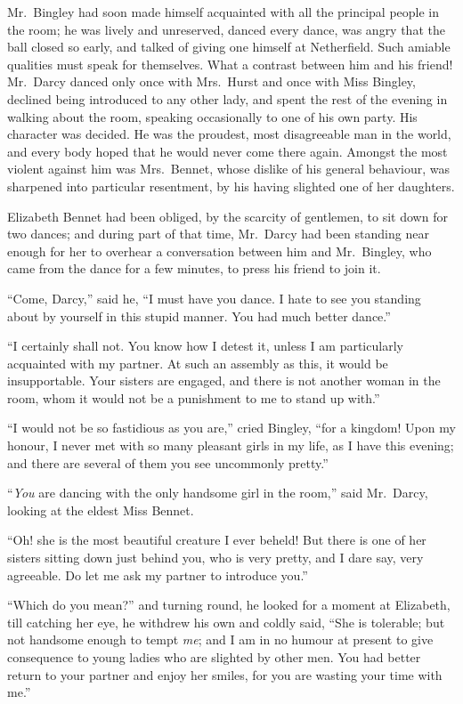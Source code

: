 Mr.\ Bingley had soon made himself acquainted with
all the principal people in the room; he was lively and
unreserved, danced every dance, was angry that the ball
closed so early, and talked of giving one himself at
Netherfield. Such amiable qualities must speak for themselves.
What a contrast between him and his friend! Mr.\ Darcy
danced only once with Mrs.\ Hurst and once with Miss
Bingley, declined being introduced to any other lady, and
spent the rest of the evening in walking about the room,
speaking occasionally to one of his own party. His character
was decided. He was the proudest, most disagreeable
man in the world, and every body hoped that he would
never come there again. Amongst the most violent
against him was Mrs.\ Bennet, whose dislike of his general
behaviour, was sharpened into particular resentment, by
his having slighted one of her daughters.

Elizabeth Bennet had been obliged, by the scarcity of
gentlemen, to sit down for two dances; and during part
of that time, Mr.\ Darcy had been standing near enough
for her to overhear a conversation between him and
Mr.\ Bingley, who came from the dance for a few minutes,
to press his friend to join it.

“Come, Darcy,” said he, “I must have you dance.
I hate to see you standing about by yourself in this stupid
manner. You had much better dance.”

“I certainly shall not. You know how I detest it,
unless I am particularly acquainted with my partner. At
such an assembly as this, it would be insupportable.
Your sisters are engaged, and there is not another woman
in the room, whom it would not be a punishment to me
to stand up with.”

“I would not be so fastidious as you are,” cried Bingley,
“for a kingdom! Upon my honour, I never met with
so many pleasant girls in my life, as I have this evening;
and there are several of them you see uncommonly pretty.”

“\textit{You} are dancing with the only handsome girl in the
room,” said Mr.\ Darcy, looking at the eldest Miss Bennet.

“Oh! she is the most beautiful creature I ever beheld!
But there is one of her sisters sitting down just behind
you, who is very pretty, and I dare say, very agreeable.
Do let me ask my partner to introduce you.”

“Which do you mean?” and turning round, he looked
for a moment at Elizabeth, till catching her eye, he withdrew
his own and coldly said, “She is tolerable; but not
handsome enough to tempt \textit{me}; and I am in no humour
at present to give consequence to young ladies who are
slighted by other men. You had better return to your
partner and enjoy her smiles, for you are wasting your
time with me.”

